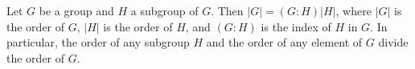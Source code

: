 Let $G$ be a group and $H$ a subgroup of $G$. Then $|G| = (G:H)|H|$, where $|G|$ is the order of $G$, $|H|$ is the order of $H$, and $(G:H)$ is the index of $H$ in $G$. In particular, the order of any subgroup $H$ and the order of any element of $G$ divide the order of $G$.
